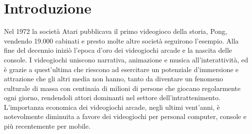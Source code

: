 %
%

\chapter*{Introduzione}





Nel 1972 la società Atari pubblicava il primo videogioco della storia, Pong, vendendo 19.000 cabinati e presto molte altre società seguirono l'esempio. Alla fine del decennio iniziò l'epoca d'oro dei videogiochi arcade e la nascita delle console\cite{High_Score}. I videogiochi uniscono narrativa, animazione e musica all'interattività, ed è grazie a quest'ultima che riescono ad esercitare un potenziale d'immersione e attrazione che gli altri media non hanno, tanto da diventare un fenomeno culturale di massa con centinaia di milioni di persone che giocano regolarmente ogni giorno, rendendoli attori dominanti nel settore dell'intrattenimento. L'importanza economica dei videogiochi arcade, negli ultimi vent'anni, è notevolmente diminuita a favore dei videogiochi per personal computer, console e più recentemente per mobile.

